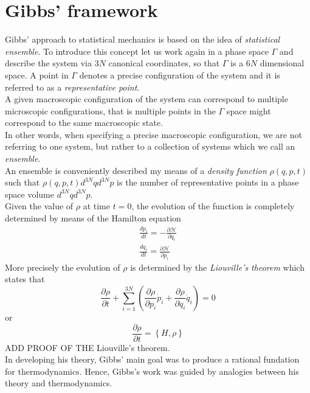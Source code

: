 \section{Gibbs' framework}
Gibbs' approach to statistical mechanics is based on the idea of \emph{statistical ensemble}. To introduce this concept
let us work again in a phase space $\Gamma$ and describe the system via $3N$ canonical coordinates, so that $\Gamma$ is a $6N$ dimensional space. A point in $\Gamma$ denotes
a precise configuration of the system and it is referred to as a \emph{representative point}. \\
A given macroscopic configuration of the system can correspond to multiple microscopic configurations, that is multiple points in the $\Gamma$ space might correspond to the same macroscopic state. \\
In other words, when specifying a precise macroscopic configuration, we are not referring to one system, but rather to a collection of systems which we call an \emph{ensemble}. \\
An ensemble is conveniently described my means of a \emph{density function} $\rho(q, p ,t)$ such that $\rho(q, p, t) d^{3N}qd^{3N}p$ is the number of representative points in a phase space volume $d^{3N}qd^{3N}p$. \\
Given the value of $\rho$ at time $t=0$, the evolution of the function is completely determined by means of the Hamilton equation 
\begin{gather*}
    \frac{dp_i}{dt} = -\frac{\partial \mathcal H}{\partial q_i} \\
    \frac{dq_i}{dt} = \frac{\partial \mathcal H}{\partial p_i}
\end{gather*}
More precisely the evolution of $\rho$ is determined by the \emph{Liouville's theorem} which states that
\begin{equation}
    \frac{\partial \rho}{\partial t} + \sum_{i=1}^{3N} \left(\frac{\partial \rho}{\partial p_i}\dot p_i + \frac{\partial \rho}{\partial q_i} \dot q_i\right) = 0
\end{equation}
or 
\begin{equation*}
    \frac{\partial \rho}{\partial t} = \left\{H, \rho\right\}
\end{equation*}
ADD PROOF OF THE Liouville's theorem. \\
\vspace{10pt}
In developing his theory, Gibbs' main goal was to produce a rational fundation for thermodynamics. Hence, Gibbs's work was guided by analogies between his theory and thermodynamics. \\
